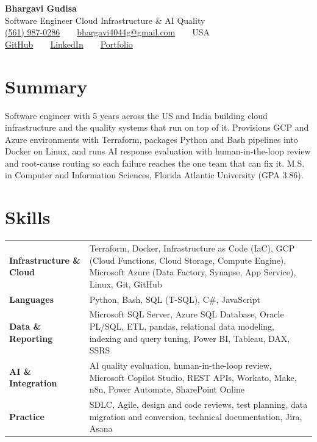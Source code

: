 \documentclass[letterpaper,10pt]{article}
\makeatletter
\newcommand{\myname}{Bhargavi Gudisa}
\newcommand{\mytitle}{Software Engineer  Cloud Infrastructure \& AI Quality}
\newcommand{\myphone}{\href{tel:+15619870286}{(561) 987-0286}}
\newcommand{\myemail}{\href{mailto:bhargavi4044g@gmail.com}{bhargavi4044g@gmail.com}}
\newcommand{\mylocation}{USA}
\newcommand{\mysite}{\href{https://bhargavigudisa.github.io}{Portfolio}}
\newcommand{\mylinkedin}{\href{https://www.linkedin.com/in/bhargavi-gudisa-a2b05021b/}{LinkedIn}}
\newcommand{\mygithub}{\href{https://github.com/BhargaviGudisa}{GitHub}}
\newcommand{\sep}{~~\textbullet~~}
\newcommand{\pipe}{~~\textcolor{rulegray}{\textbar}~~}
\makeatother
\begin{document}
\begin{center}
  {\LARGE\bfseries\myname}\\[3pt]
  {\small\mytitle}\\[5pt]
  {\small
    \myphone\sep\myemail\sep\mylocation\\[3pt]
    \mygithub\pipe\mylinkedin\pipe\mysite
  }
\end{center}
\vspace{-4pt}

\section{Summary}

Software engineer with 5 years across the US and India building cloud
infrastructure and the quality systems that run on top of it. Provisions GCP and
Azure environments with Terraform, packages Python and Bash pipelines into Docker
on Linux, and runs AI response evaluation with human-in-the-loop review and
root-cause routing so each failure reaches the one team that can fix it. M.S. in
Computer and Information Sciences, Florida Atlantic University (GPA 3.86).

\section{Skills}

\begin{tabularx}{\linewidth}{@{}>{\bfseries}l X@{}}
  Infrastructure \& Cloud~ & Terraform, Docker, Infrastructure as Code (IaC),
    GCP (Cloud Functions, Cloud Storage, Compute Engine), Microsoft Azure
    (Data Factory, Synapse, App Service), Linux, Git, GitHub \\[2.5pt]
  Languages & Python, Bash, SQL (T-SQL), C\#, JavaScript \\[2.5pt]
  Data \& Reporting & Microsoft SQL Server, Azure SQL Database, Oracle PL/SQL,
    ETL, pandas, relational data modeling, indexing and query tuning,
    Power BI, Tableau, DAX, SSRS \\[2.5pt]
  AI \& Integration & AI quality evaluation, human-in-the-loop review, Microsoft
    Copilot Studio, REST APIs, Workato, Make, n8n, Power Automate,
    SharePoint Online \\[2.5pt]
  Practice & SDLC, Agile, design and code reviews, test planning, data migration
    and conversion, technical documentation, Jira, Asana \\
\end{tabularx}
\end{document}
